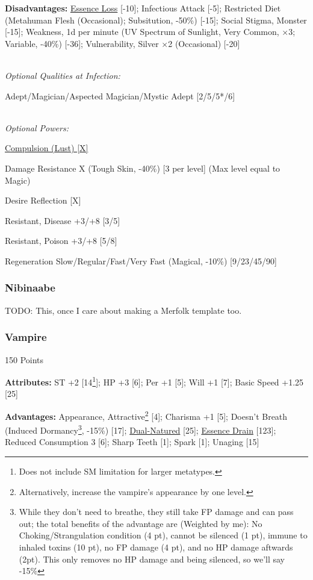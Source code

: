 \begin{multicols*}{3}
	\textbf{Disadvantages:}	
	\hyperref[essence_loss]{Essence Loss} [-10]; Infectious Attack [-5]; Restricted Diet (Metahuman Flesh (Occasional); Subsitution, -50\%) [-15]; Social Stigma, Monster [-15]; Weakness, 1d per minute (UV Spectrum of Sunlight, Very Common, $\times$3; Variable, -40\%) [-36]; Vulnerability, Silver $\times$2 (Occasional) [-20]
	
	\textit{\\Optional Qualities at Infection:}
	
	Adept/Magician/Aspected Magician/Mystic Adept [2/5/5*/6]
	
	\textit{\\Optional Powers:}
	
	\hyperref[compulsion]{Compulsion (Lust) [X]}
	
	Damage Resistance X (Tough Skin, -40\%) [3 per level] (Max level equal to Magic)
	
	Desire Reflection [X]
	
	Resistant, Disease +3/+8 [3/5]
	
	Resistant, Poison +3/+8 [5/8]	
	
	Regeneration Slow/Regular/Fast/Very Fast (Magical, -10\%) [9/23/45/90]
	
	\subsubsection{Nibinaabe}\label{nibinaabe}
	TODO: This, once I care about making a Merfolk template too.
	
	\subsubsection{Vampire}\label{vampire}
	\begin{flushright}
		150 Points
	\end{flushright}
	
	\textbf{Attributes:}
	ST +2 [14\footnote{Does not include SM limitation for larger metatypes.}]; HP +3 [6]; Per +1 [5]; Will +1 [7]; Basic Speed +1.25 [25]
	
	\textbf{Advantages:}
	Appearance, Attractive\footnote{Alternatively, increase the vampire's appearance by one level.} [4]; Charisma +1 [5]; Doesn't Breath (Induced Dormancy\footnote{While they don't need to breathe, they still take FP damage and can pass out; the total benefits of the advantage are (Weighted by me): No Choking/Strangulation condition (4 pt), cannot be silenced (1 pt), immune to inhaled toxins (10 pt), no FP damage (4 pt), and no HP damage aftwards (2pt). This only removes no HP damage and being silenced, so we'll say -15\%}, -15\%) [17]; \hyperref[dual_natured]{Dual-Natured} [25];  \hyperref[essence_drain]{Essence Drain} [123]; Reduced Consumption 3 [6]; Sharp Teeth [1]; Spark [1]; Unaging [15]
		

\end{multicols*}
